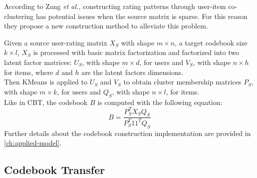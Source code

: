 According to Zang \textit{et al.}, constructing rating patterns through user-item co-clustering has potential issues when the source matrix is sparse. For this reason they propose a new construction method to alleviate this problem.\par
Given a source user-rating matrix $X_S$ with shape $m \times n$, a target codebook size $k \times l$, $X_S$ is processed with basic matrix factorization and factorized into two latent factor matrices: $U_S$, with shape $m \times d$, for users and $V_S$, with shape $n \times h$ for items, where $d$ and $h$ are the latent factors dimensions.\\
Then KMeans is applied to $U_S$ and $V_S$ to obtain cluster membership matrices $P_S$, with shape $m \times k$, for users and $Q_S$, with shape $n \times l$, for items.\\
Like in CBT, the codebook $B$ is computed with the following equation:
\begin{equation}
B = \frac{P_S^T X_S Q_S}{P_S^T 11^T Q_S}
\end{equation}
Further details about the codebook construction implementation are provided in \autoref{ch:applied-model}.


\subsection{Codebook Transfer}

